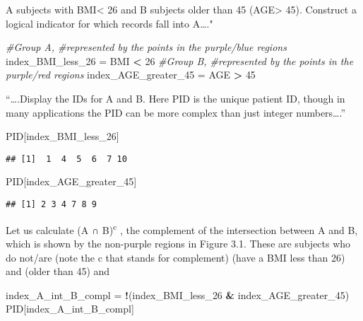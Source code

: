 \documentclass[]{article}
\newenvironment{Shaded}{\begin{snugshade}}{\end{snugshade}}
\newcommand{\CommentTok}[1]{\textcolor[rgb]{0.56,0.35,0.01}{\textit{#1}}}
\newcommand{\DecValTok}[1]{\textcolor[rgb]{0.00,0.00,0.81}{#1}}
\newcommand{\NormalTok}[1]{#1}
\newcommand{\OperatorTok}[1]{\textcolor[rgb]{0.81,0.36,0.00}{\textbf{#1}}}
\newcommand{\StringTok}[1]{\textcolor[rgb]{0.31,0.60,0.02}{#1}}
\begin{document}
A subjects with BMI\textless{} 26 and B subjects older than 45
(AGE\textgreater{} 45). Construct a logical indicator for which records
fall into A\ldots{}."

\begin{Shaded}
\begin{Highlighting}[]
\CommentTok{#Group A, #represented by the points in the purple/blue regions}
\NormalTok{index_BMI_less_}\DecValTok{26}\NormalTok{ =}\StringTok{ }\NormalTok{BMI }\OperatorTok{<}\StringTok{ }\DecValTok{26} 
\CommentTok{#Group B, #represented by the points in the purple/red regions }
\NormalTok{index_AGE_greater_}\DecValTok{45}\NormalTok{ =}\StringTok{ }\NormalTok{AGE }\OperatorTok{>}\StringTok{ }\DecValTok{45} 
\end{Highlighting}
\end{Shaded}

``\ldots{}.Display the IDs for A and B. Here PID is the unique patient
ID, though in many applications the PID can be more complex than just
integer numbers\ldots{}.''

\begin{Shaded}
\begin{Highlighting}[]
\NormalTok{PID[index_BMI_less_}\DecValTok{26}\NormalTok{]}
\end{Highlighting}
\end{Shaded}

\begin{verbatim}
## [1]  1  4  5  6  7 10
\end{verbatim}

\begin{Shaded}
\begin{Highlighting}[]
\NormalTok{PID[index_AGE_greater_}\DecValTok{45}\NormalTok{]}
\end{Highlighting}
\end{Shaded}

\begin{verbatim}
## [1] 2 3 4 7 8 9
\end{verbatim}

Let us calculate (A ∩ B)\textsuperscript{c} , the complement of the
intersection between A and B, which is shown by the non-purple regions
in Figure 3.1. These are subjects who do not/are (note the c that stands
for complement) (have a BMI less than 26) and (older than 45) and

\begin{Shaded}
\begin{Highlighting}[]
\NormalTok{index_A_int_B_compl =}\StringTok{ }\OperatorTok{!}\NormalTok{(index_BMI_less_}\DecValTok{26} \OperatorTok{&}\StringTok{ }\NormalTok{index_AGE_greater_}\DecValTok{45}\NormalTok{) }
\NormalTok{PID[index_A_int_B_compl]}
\end{Highlighting}
\end{Shaded}
\end{document}
